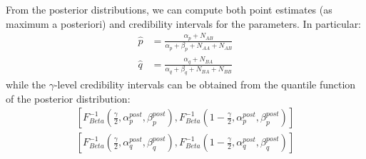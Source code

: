 \documentclass[twocolumn, 9pt]{extarticle}
\begin{document}
From the posterior distributions, we can compute both point estimates (as maximum a posteriori) and credibility intervals for the parameters. In particular:
\begin{align*}
    \hat p &= \frac{\alpha_p + N_{AB}}{\alpha_p + \beta_p + N_{AA} + N_{AB}} \\
    \hat q &= \frac{\alpha_q + N_{BA}}{\alpha_q + \beta_q + N_{BA} + N_{BB}}
\end{align*}
while the $\gamma$-level credibility intervals can be obtained from the quantile function of the posterior distribution:
\begin{align*}
    \left[ F_\textit{Beta}^{-1}(\frac{\gamma}{2}, \alpha^{post}_{p}, \beta^{post}_{p}), F_\textit{Beta}^{-1}(1 - \frac{\gamma}{2}, \alpha^{post}_{p}, \beta^{post}_{p}) \right] \\
    \left[ F_\textit{Beta}^{-1}(\frac{\gamma}{2}, \alpha^{post}_{q}, \beta^{post}_{q}), F_\textit{Beta}^{-1}(1 - \frac{\gamma}{2}, \alpha^{post}_{q}, \beta^{post}_{q}) \right]
\end{align*}
\end{document}
